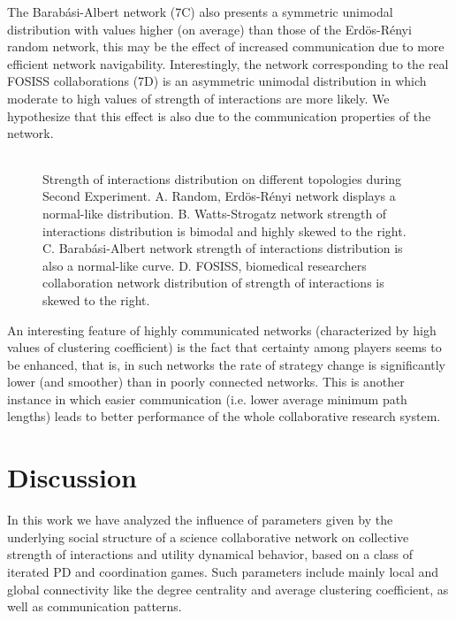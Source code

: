 \documentclass{bmcart}
\def\texttt{[image: ]}
\begin{document}
The Barab\'asi-Albert network (7C) also presents a symmetric unimodal
distribution with values higher (on average) than those of the
Erd\"{o}s-R\'enyi random network, this may be the effect of increased
communication due to more efficient network
navigability. Interestingly, the network corresponding to the real
FOSISS collaborations (7D) is an asymmetric unimodal distribution in
which moderate to high values of strength of interactions are more
likely. We hypothesize that this effect is also due to the
communication properties of the
network. \\

\begin{figure} [h!]
\centering
\begin{tabular}{cc}

\end{tabular}
\caption{Strength of interactions distribution on different topologies during Second Experiment. A. Random, Erd\"{o}s-R\'enyi network displays a normal-like
distribution. B. Watts-Strogatz network strength of interactions distribution is bimodal and highly skewed to the right. C.
Barab\'asi-Albert network strength of interactions distribution is also a
normal-like curve. D. FOSISS, biomedical researchers collaboration network distribution of strength of interactions is skewed to the right.}\label{histo_trust}  
\end{figure}


An interesting feature of highly communicated networks (characterized
by high values of clustering coefficient) is the fact that certainty
among players seems to be enhanced, that is, in such networks the rate
of strategy change is significantly lower (and smoother) than in
poorly connected networks. This is another instance in which easier
communication (i.e. lower average minimum path lengths) leads to better
performance of the whole collaborative research system.\\

\section*{Discussion}
\label{sec:3}

In this work we have analyzed the influence of parameters
  given by the underlying social structure of a science collaborative
  network on collective strength of interactions and utility dynamical
  behavior, based on a class of iterated PD and coordination
  games. Such parameters include mainly local and global connectivity
  like the degree centrality and average clustering coefficient, as
  well as communication patterns.\\
\end{document}
